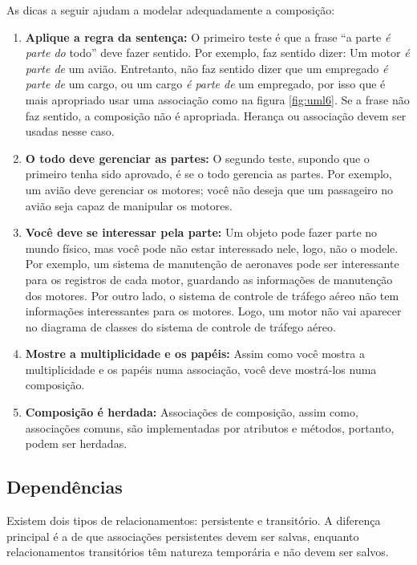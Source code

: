 \documentclass[
	11pt,				%
	openright,
	twoside,			%
	a4paper,			%
	english,			%
	french,
	brazil,				%
	sumario=tradicional
	]{abntex2}
\begin{document}
As dicas a seguir ajudam a modelar adequadamente a composição:
\begin{enumerate}
\item \textbf{Aplique a regra da sentença:} O primeiro teste é que a frase ``a parte \emph{é parte do} todo'' deve fazer sentido. Por exemplo, faz sentido dizer: Um motor \emph{é parte de} um avião. Entretanto, não faz sentido dizer que um empregado \emph{é parte de} um cargo, ou um cargo \emph{é parte de} um empregado, por isso que é mais apropriado usar uma associação como na figura \ref{fig:uml6}. Se a frase não faz sentido, a composição não é apropriada. Herança ou associação devem ser usadas nesse caso.

\item \textbf{O todo deve gerenciar as partes:} O segundo teste, supondo que o primeiro tenha sido aprovado, é se o todo gerencia as partes. Por exemplo, um avião deve gerenciar os motores; você não deseja que um passageiro no avião seja capaz de manipular os motores.

\item \textbf{Você deve se interessar pela parte:} Um objeto pode fazer parte no mundo físico, mas você pode não estar interessado nele, logo, não o modele. Por exemplo, um sistema de manutenção de aeronaves pode ser interessante para os registros de cada motor, guardando as informações de manutenção dos motores. Por outro lado, o sistema de controle de tráfego aéreo não tem informações interessantes para os motores. Logo, um motor não vai aparecer no diagrama de classes do sistema de controle de tráfego aéreo.

\item \textbf{Mostre a multiplicidade e os papéis:} Assim como você mostra a multiplicidade e os papéis numa associação, você deve mostrá-los numa composição.

\item \textbf{Composição é herdada:} Associações de composição, assim como, associações comuns, são implementadas por atributos e métodos, portanto, podem ser herdadas.
\end{enumerate}

\subsection{Dependências}

Existem dois tipos de relacionamentos: persistente e transitório. A diferença principal é a de que associações persistentes devem ser salvas, enquanto relacionamentos transitórios têm natureza temporária e não devem ser salvos.
\end{document}
